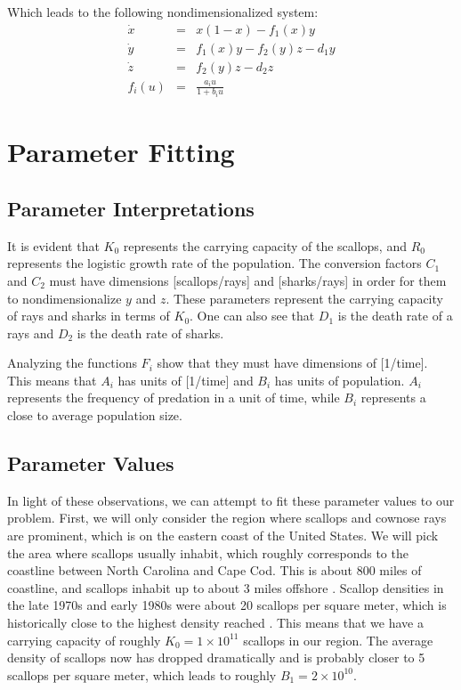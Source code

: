 \documentclass[12pt,journal,compsoc,twoside]{IEEEtran}
\begin{document}
Which leads to the following nondimensionalized system:
\begin{eqnarray}
\dot{x} &=& x(1-x) - f_1(x) y \nonumber \\
\dot{y} &=& f_1(x) y - f_2(y) z - d_1 y \\
\dot{z} &=& f_2(y) z - d_2 z \nonumber \\
f_i(u) &=& \frac{a_i u}{1 + b_i u} \nonumber
\label{eqn:system}
\end{eqnarray}

\section{Parameter Fitting}

\subsection{Parameter Interpretations}

It is evident that $K_0$ represents the carrying capacity of the scallops, and $R_0$ represents the logistic growth rate of the population. The conversion factors $C_1$ and $C_2$ must have dimensions [scallops/rays] and [sharks/rays] in order for them to nondimensionalize $y$ and $z$. These parameters represent the carrying capacity of rays and sharks in terms of $K_0$. One can also see that $D_1$ is the death rate of a rays and $D_2$ is the death rate of sharks. 

Analyzing the functions $F_i$ show that they must have dimensions of [1/time]. This means that $A_i$ has units of [1/time] and $B_i$ has units of population. $A_i$ represents the frequency of predation in a unit of time, while $B_i$ represents a close to average population size. 

\subsection{Parameter Values}

In light of these observations, we can attempt to fit these parameter values to our problem. First, we will only consider the region where scallops and cownose rays are prominent, which is on the eastern coast of the United States. We will pick the area where scallops usually inhabit, which roughly corresponds to the coastline between North Carolina and Cape Cod. This is about 800 miles of coastline, and scallops inhabit up to about 3 miles offshore \cite{Fay(1983)}. Scallop densities in the late 1970s and early 1980s were about 20 scallops per square meter, which is historically close to the highest density reached \cite{Fay(1983)}. This means that we have a carrying capacity of roughly $K_0 = 1 \times 10^{11}$ scallops in our region. The average density of scallops now has dropped dramatically and is probably closer to 5 scallops per square meter, which leads to roughly $B_1 = 2 \times 10^{10}$. 
\end{document}
